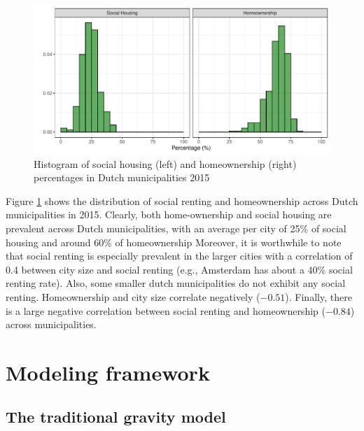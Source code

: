 \documentclass[fleqn,10pt]{SelfArx} %
\begin{document}
        \begin{figure}[ht]\centering %
          \includegraphics[width=0.8\linewidth]{../fig/hist_housing.pdf}
          \caption{Histogram of social housing (left) and
            homeownership (right) percentages in Dutch municipalities
            2015}
            \label{fig:housing_mig}
        \end{figure}

        Figure \ref{fig:housing_mig} shows the distribution of social renting
        and homeownership across Dutch municipalities in 2015.  Clearly, both
        home-ownership and social housing are prevalent across Dutch
        municipalities, with an average per city of 25\% of social housing and around
        60\% of homeownership
    	Moreover, it is worthwhile to note that social
        renting is especially prevalent in the larger cities with a correlation
        of 0.4 between city size and social renting (e.g., Amsterdam has about a
        40\% social renting rate). Also, some smaller dutch municipalities do
        not exhibit any social renting. Homeownership and city size correlate
        negatively ($-0.51$). Finally, there is a large negative correlation
        between social renting and homeownership ($-0.84$) across
        municipalities.
        
        \section{Modeling framework}

        \subsection{The traditional gravity model}
\end{document}
